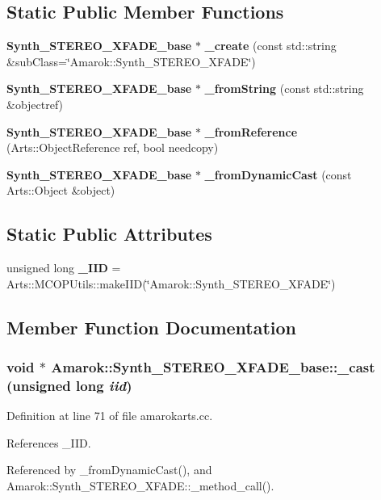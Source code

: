 \subsection*{Static Public Member Functions}
\begin{CompactItemize}
\item 
{\bf Synth\_\-STEREO\_\-XFADE\_\-base} $\ast$ {\bf \_\-create} (const std::string \&sub\-Class=\char`\"{}Amarok::Synth\_\-STEREO\_\-XFADE\char`\"{})
\item 
{\bf Synth\_\-STEREO\_\-XFADE\_\-base} $\ast$ {\bf \_\-from\-String} (const std::string \&objectref)
\item 
{\bf Synth\_\-STEREO\_\-XFADE\_\-base} $\ast$ {\bf \_\-from\-Reference} (Arts::Object\-Reference ref, bool needcopy)
\item 
{\bf Synth\_\-STEREO\_\-XFADE\_\-base} $\ast$ {\bf \_\-from\-Dynamic\-Cast} (const Arts::Object \&object)
\end{CompactItemize}
\subsection*{Static Public Attributes}
\begin{CompactItemize}
\item 
unsigned long {\bf \_\-IID} = Arts::MCOPUtils::make\-IID(\char`\"{}Amarok::Synth\_\-STEREO\_\-XFADE\char`\"{})
\end{CompactItemize}


\subsection{Member Function Documentation}
\subsubsection{\setlength{\rightskip}{0pt plus 5cm}void $\ast$ Amarok::Synth\_\-STEREO\_\-XFADE\_\-base::\_\-cast (unsigned long {\em iid})}\label{classAmarok_1_1Synth__STEREO__XFADE__base_Amarok_1_1Synth__STEREO__XFADE__stuba6}




Definition at line 71 of file amarokarts.cc.

References \_\-IID.

Referenced by \_\-from\-Dynamic\-Cast(), and Amarok::Synth\_\-STEREO\_\-XFADE::\_\-method\_\-call().



